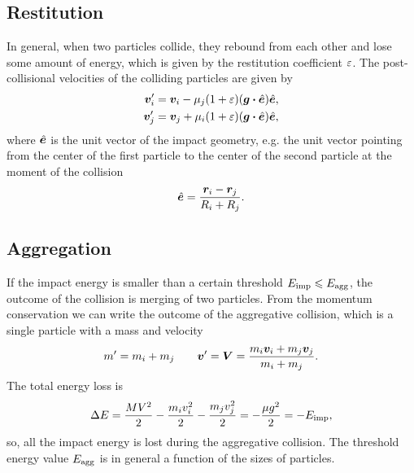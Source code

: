\documentclass[aps,prl,preprint,groupedaddress,10pt]{revtex4-2}
\begin{document}
\subsection{Restitution}
In general, when two particles collide, they rebound from each other and lose some amount
of energy, which is given by the restitution coefficient $\varepsilon$. The post-collisional 
velocities of the colliding particles are given by
\begin{equation}
    \begin{split}
        \bv_i'&=\bv_i-\mu_j\pqty{1+\eps}\pqty{\bg\vdot\be}\be,\\
        \bv_j'&=\bv_j+\mu_i\pqty{1+\eps}\pqty{\bg\vdot\be}\be,
    \end{split}
\end{equation}
where $\hat{\vb*{e}}$ is the unit vector of the impact geometry, e.g. the unit vector pointing 
from the center of the first particle to the center of the second particle at the moment
of the collision
\begin{equation}
    \hat{\vb*{e}}=\frac{\vb*{r}_i-\vb*{r}_j}{R_i+R_j}.
\end{equation}

\subsection{Aggregation}
If the impact energy is smaller than a certain threshold 
$E_{\mathrm{imp}}\leqslant E_{\mathrm{agg}}$, the outcome of the collision is merging of two 
particles. From the momentum conservation we can write the outcome of the aggregative 
collision, which is a single particle with a mass and velocity
\begin{equation}
    m'=m_i+m_j\qquad\vb*{v}'=\vb*{V}=\frac{m_i\vb*{v}_i+m_j\vb*{v}_j}{m_i+m_j}.
\end{equation}
The total energy loss is 
\begin{equation}    
        \Delta E=\frac{MV^2}{2}-\frac{m_iv_i^2}{2}-\frac{m_jv_j^2}{2}
        =-\frac{\mu g^2}{2}=-E_{\mathrm{imp}},
\end{equation}
so, all the impact energy is lost during the aggregative collision.
The threshold energy value $E_{\mathrm{agg}}$ is in general a function of the sizes of 
particles.
\end{document}
